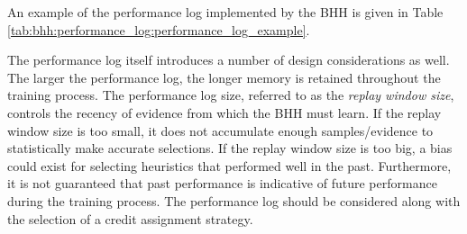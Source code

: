 An example of the performance log implemented by the \acs{BHH} is given in Table \ref{tab:bhh:performance_log:performance_log_example}.

\begin{table}[htbp]
      \centering
      \caption{An example of the performance log implemented by the \acs{BHH}, showing the first five entities, their allocated heuristics and their resulting performance measurements for step 1 of the training process.}
      \label{tab:bhh:performance_log:performance_log_example}%
      \par\bigskip
\end{table}%

The performance log itself introduces a number of design considerations as well. The larger the performance log, the longer memory is retained throughout the training process. The performance log size, referred to as the \textit{replay window size}, controls the recency of evidence from which the \acs{BHH} must learn. If the replay window size is too small, it does not accumulate enough samples/evidence to statistically make accurate selections. If the replay window size is too big, a bias could exist for selecting heuristics that performed well in the past. Furthermore, it is not guaranteed that past performance is indicative of future performance during the training process. The performance log should be considered along with the selection of a credit assignment strategy.


